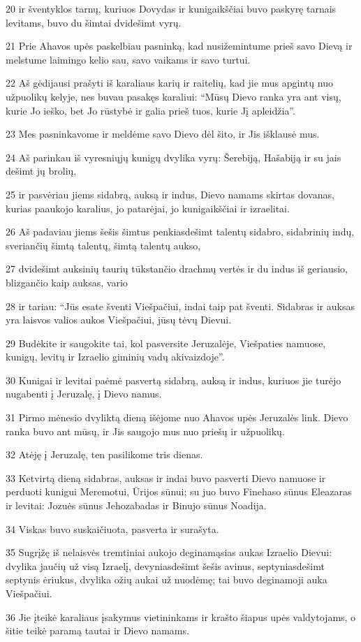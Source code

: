 \par 20 ir šventyklos tarnų, kuriuos Dovydas ir kunigaikščiai buvo paskyrę tarnais levitams, buvo du šimtai dvidešimt vyrų. 
\par 21 Prie Ahavos upės paskelbiau pasninką, kad nusižemintume prieš savo Dievą ir melstume laimingo kelio sau, savo vaikams ir savo turtui. 
\par 22 Aš gėdijausi prašyti iš karaliaus karių ir raitelių, kad jie mus apgintų nuo užpuolikų kelyje, nes buvau pasakęs karaliui: “Mūsų Dievo ranka yra ant visų, kurie Jo ieško, bet Jo rūstybė ir galia prieš tuos, kurie Jį apleidžia”. 
\par 23 Mes pasninkavome ir meldėme savo Dievo dėl šito, ir Jis išklausė mus. 
\par 24 Aš parinkau iš vyresniųjų kunigų dvylika vyrų: Šerebiją, Hašabiją ir su jais dešimt jų brolių, 
\par 25 ir pasvėriau jiems sidabrą, auksą ir indus, Dievo namams skirtas dovanas, kurias paaukojo karalius, jo patarėjai, jo kunigaikščiai ir izraelitai. 
\par 26 Aš padaviau jiems šešis šimtus penkiasdešimt talentų sidabro, sidabrinių indų, sveriančių šimtą talentų, šimtą talentų aukso, 
\par 27 dvidešimt auksinių taurių tūkstančio drachmų vertės ir du indus iš geriausio, blizgančio kaip auksas, vario 
\par 28 ir tariau: “Jūs esate šventi Viešpačiui, indai taip pat šventi. Sidabras ir auksas yra laisvos valios aukos Viešpačiui, jūsų tėvų Dievui. 
\par 29 Budėkite ir saugokite tai, kol pasversite Jeruzalėje, Viešpaties namuose, kunigų, levitų ir Izraelio giminių vadų akivaizdoje”. 
\par 30 Kunigai ir levitai paėmė pasvertą sidabrą, auksą ir indus, kuriuos jie turėjo nugabenti į Jeruzalę, į Dievo namus. 
\par 31 Pirmo mėnesio dvyliktą dieną išėjome nuo Ahavos upės Jeruzalės link. Dievo ranka buvo ant mūsų, ir Jis saugojo mus nuo priešų ir užpuolikų. 
\par 32 Atėję į Jeruzalę, ten pasilikome tris dienas. 
\par 33 Ketvirtą dieną sidabras, auksas ir indai buvo pasverti Dievo namuose ir perduoti kunigui Meremotui, Ūrijos sūnui; su juo buvo Finehaso sūnus Eleazaras ir levitai: Jozuės sūnus Jehozabadas ir Binujo sūnus Noadija. 
\par 34 Viskas buvo suskaičiuota, pasverta ir surašyta. 
\par 35 Sugrįžę iš nelaisvės tremtiniai aukojo deginamąsias aukas Izraelio Dievui: dvylika jaučių už visą Izraelį, devyniasdešimt šešis avinus, septyniasdešimt septynis ėriukus, dvylika ožių aukai už nuodėmę; tai buvo deginamoji auka Viešpačiui. 
\par 36 Jie įteikė karaliaus įsakymus vietininkams ir krašto šiapus upės valdytojams, o šitie teikė paramą tautai ir Dievo namams.



